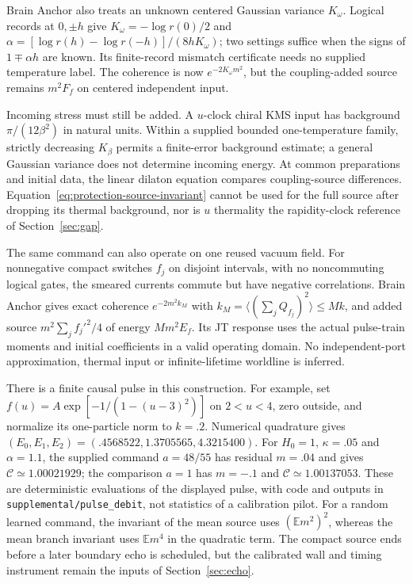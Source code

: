 \documentclass[12pt,a4paper]{article}
\begin{document}
Brain Anchor also treats an unknown centered Gaussian variance $K_\omega$. Logical records at $0,\pm h$ give
$K_\omega=-\log r(0)/2$ and
$\alpha=[\log r(h)-\log r(-h)]/(8hK_\omega)$; two settings suffice when the signs of $1\mp\alpha h$ are known. Its finite-record mismatch certificate needs no supplied temperature label. The coherence is now $e^{-2K_\omega m^2}$, but the coupling-added source remains $m^2F_f$ on centered independent input.

Incoming stress must still be added. A $u$-clock chiral KMS input has background $\pi/(12\beta^2)$ in natural units. Within a supplied bounded one-temperature family, strictly decreasing $K_\beta$ permits a finite-error background estimate; a general Gaussian variance does not determine incoming energy. At common preparations and initial data, the linear dilaton equation compares coupling-source differences. Equation~\eqref{eq:protection-source-invariant} cannot be used for the full source after dropping its thermal background, nor is $u$ thermality the rapidity-clock reference of Section~\ref{sec:gap}.

The same command can also operate on one reused vacuum field. For nonnegative compact switches $f_j$ on disjoint intervals, with no noncommuting logical gates, the smeared currents commute but have negative correlations. Brain Anchor gives exact coherence $e^{-2m^2k_M}$ with
$k_M=\langle(\sum_jQ_{f_j})^2\rangle\le Mk$, and added source $m^2\sum_jf_j'^2/4$ of energy $Mm^2E_f$. Its JT response uses the actual pulse-train moments and initial coefficients in a valid operating domain. No independent-port approximation, thermal input or infinite-lifetime worldline is inferred.

There is a finite causal pulse in this construction. For example, set
$f(u)=A\exp[-1/(1-(u-3)^2)]$ on $2<u<4$, zero outside, and normalize
its one-particle norm to $k=.2$. Numerical quadrature gives
$(E_0,E_1,E_2)=(.4568522,1.3705565,4.3215400)$.
For $H_0=1$, $\kappa=.05$ and $\alpha=1.1$, the supplied command
$a=48/55$ has residual $m=.04$ and gives
$\mathcal C\simeq1.00021929$; the comparison $a=1$
has $m=-.1$ and $\mathcal C\simeq1.00137053$.
These are deterministic evaluations of the displayed pulse, with code
and outputs in \texttt{supplemental/pulse\_debit}, not statistics of
a calibration pilot. For a random learned command,
the invariant of the mean source uses $(\mathbb E m^2)^2$, whereas
the mean branch invariant uses $\mathbb E m^4$ in the quadratic term. The compact source ends before a later boundary echo is
scheduled, but the calibrated wall and timing instrument remain the
inputs of Section~\ref{sec:echo}.
\end{document}

